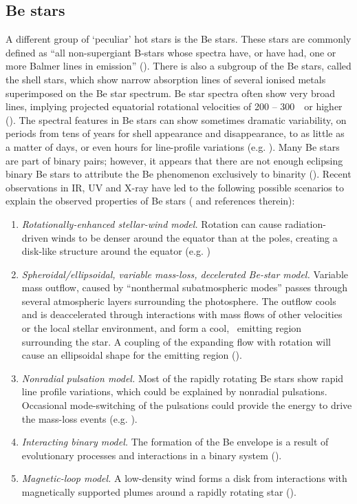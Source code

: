 \subsection{Be stars}
\label{sec:intro:be}

A different group of `peculiar' hot stars is the Be stars. These stars
are commonly defined as ``all non-supergiant B-stars whose spectra
have, or have had, one or more Balmer lines in emission''
(\cite{sl:88}). There is also a subgroup of the Be stars, called the
shell stars, which show narrow absorption lines of several ionised
metals superimposed on the Be star spectrum. Be star spectra often
show very broad lines, implying projected equatorial rotational
velocities of 200 -- 300~\kms\ or higher (\cite{sl:82}). The spectral
features in Be stars can show sometimes dramatic variability, on
periods from tens of years for shell appearance and disappearance, to
as little as a matter of days, or even hours for line-profile
variations (e.g. \cite{1997ApJ...481..479S}). Many Be stars are part
of binary pairs; however, it appears that there are not enough
eclipsing binary Be stars to attribute the Be phenomenon exclusively
to binarity (\cite{1976IAUS...70..439P}). Recent observations in IR,
UV and X-ray have led to the following possible scenarios to explain
the observed properties of Be stars (\cite{sl:88} and references
therein):

\begin{enumerate}
\item	\emph{Rotationally-enhanced stellar-wind
	model.} Rotation can cause radiation-driven winds to be
	denser around the equator than at the poles, creating a
	disk-like structure around the equator (e.g. \cite{1993ApJ...409..429B})

\item	\emph{Spheroidal/ellipsoidal, variable mass-loss, decelerated
	Be-star model.} Variable mass outflow, caused by ``nonthermal
	subatmospheric modes'' passes through several atmospheric
	layers surrounding the photosphere. The outflow cools and is
	deaccelerated through interactions with mass flows of other
	velocities or the local stellar environment, and form a cool,
	\ha\ emitting region surrounding the star. A coupling of the
	expanding flow with rotation will cause an ellipsoidal shape
	for the emitting region (\cite{do:87}).

\item	\emph{Nonradial pulsation model.} Most of the rapidly rotating
	Be stars show rapid line profile variations, which could be
	explained by nonradial pulsations. Occasional mode-switching of
	the pulsations could provide the energy to drive the
	mass-loss events (e.g. \cite{1994IAUS..162..311B}).

\item	\emph{Interacting binary model.} The formation of the Be
	envelope is a result of evolutionary processes and
	interactions in a binary system (\cite{ha:87}).

\item	\emph{Magnetic-loop model.} A low-density wind forms a disk
	from interactions with magnetically supported plumes around a
	rapidly rotating star (\cite{un:87}).
\end{enumerate}

